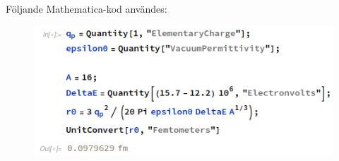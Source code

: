 
\usepackage{pdfpages}
\usepackage{incgraph}



	
\newpage

Följande Mathematica-kod användes:
\begin{figure}[H]
	\includegraphics[width=\textwidth]{Q4_Mathematica.png}
\end{figure}
\newpage




